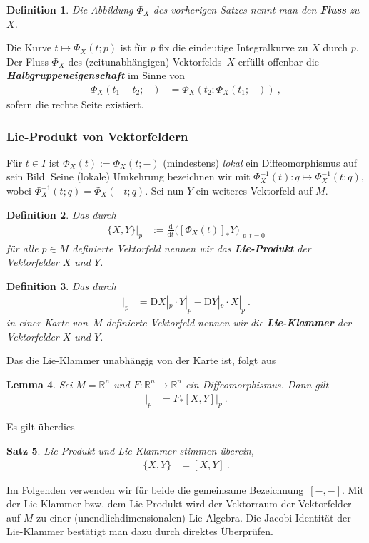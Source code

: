\documentclass[10pt,a4paper]{article}
\theoremstyle{mytheorem}
\newtheorem{theorem}{Satz}[section]
\newtheorem{lemma}[theorem]{Lemma}
\theoremstyle{mydefinition}
\newtheorem{definition}[theorem]{Definition}
\newcommand{\mydef}[1]{\textbf{\textit{#1}}}
\newcommand{\dt}{\mathrm{d}}
\newcommand{\Dt}{\mathrm{D}}
\begin{document}
\begin{definition}
Die Abbildung $\Phi_X$ des vorherigen Satzes nennt man den \mydef{Fluss} zu $X$.
\end{definition}

Die Kurve $t\mapsto\Phi_X(t; p)$ ist für $p$ fix die eindeutige Integralkurve zu $X$ durch $p$.
Der Fluss $\Phi_X$ des (zeitunabhängigen) Vektorfelds~$X$ erfüllt offenbar die \mydef{Halbgruppeneigenschaft} im Sinne von
\begin{align*}
	\Phi_X(t_1 + t_2; -)
	&= \Phi_X(t_2; \Phi_X(t_1; -))
	\ ,
\end{align*}
sofern die rechte Seite existiert.

\subsubsection{Lie-Produkt von Vektorfeldern}

Für $t\in I$ ist $\Phi_X(t):=\Phi_X(t;-)$ (mindestens) \emph{lokal} ein Diffeomorphismus auf sein Bild.
Seine (lokale) Umkehrung bezeichnen wir mit $\Phi_X^{-1}(t):q\mapsto\Phi_X^{-1}(t;q)$, wobei $\Phi_X^{-1}(t;q)=\Phi_X(-t;q)$.
Sei nun $Y$ ein weiteres Vektorfeld auf $M$.

\begin{definition}
Das durch 
\begin{align*}
	\{X, Y\}\big|_{p} &:= 
	\frac{\dt}{\dt t}
	\big(
		[\Phi_X(t)]_* Y
	\big)
	\big|_{p}
	\Big|_{t=0}
\end{align*}
für alle $p\in M$ definierte Vektorfeld nennen wir das \mydef{Lie-Produkt} der Vektorfelder $X$ und $Y$.
\end{definition}

\begin{definition}
Das durch
\begin{align*}
	[X, Y]\big|_{p}
	&=
	\Dt X|_{p}
	\cdot
	Y|_{p}
	-
	\Dt Y|_{p}
	\cdot
	X|_{p}
	\ .
\end{align*}
in einer Karte von~$M$ definierte Vektorfeld nennen wir die \mydef{Lie-Klammer} der Vektorfelder $X$ und $Y$.
\end{definition}
Das die Lie-Klammer unabhängig von der Karte ist, folgt aus
\begin{lemma}
\label{th:pushForwardLie}
Sei $M=\mathbb{R}^n$ und $F:\mathbb{R}^n\rightarrow\mathbb{R}^n$
ein Diffeomorphismus.
Dann gilt
\begin{align*}
	[F_*X, F_*Y]\big|_{p}
	&= F_*[X, Y]|_p
	\ .
\end{align*}
\end{lemma}
Es gilt überdies
\begin{theorem}
\label{th:LieBracket}
Lie-Produkt und Lie-Klammer stimmen überein,
\begin{align*}
	\{X, Y\} &= [X, Y]
	\ .
\end{align*}
\end{theorem}
Im Folgenden verwenden wir für beide die gemeinsame Bezeichnung~$[-,-]$.
Mit der Lie-Klammer bzw. dem Lie-Produkt wird der Vektorraum der Vektorfelder auf $M$ zu einer (unendlichdimensionalen) Lie-Algebra.
Die Jacobi-Identität der Lie-Klammer bestätigt man dazu durch direktes Überprüfen.
\end{document}
